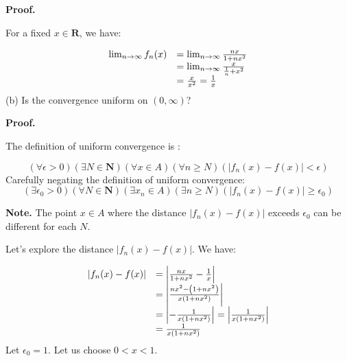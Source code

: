 \documentclass[10pt]{article}
\begin{document}
\textbf{Proof.}



For a fixed $\displaystyle x\in \mathbf{R}$, we have:


\begin{equation*}
\begin{array}{ c l }
\lim _{n\rightarrow \infty } f_{n}( x) & =\lim _{n\rightarrow \infty }\frac{nx}{1+nx^{2}}\\
 & =\lim _{n\rightarrow \infty }\frac{x}{\frac{1}{n} +x^{2}}\\
 & =\frac{x}{x^{2}} =\frac{1}{x}
\end{array}
\end{equation*}
(b) Is the convergence uniform on $\displaystyle ( 0,\infty )$?



\textbf{Proof.}



The definition of uniform convergence is :


\begin{equation*}
( \forall \epsilon  >0)( \exists N\in \mathbf{N})( \forall x\in A)( \forall n\geq N)( |f_{n}( x) -f( x) |< \epsilon )
\end{equation*}
Carefully negating the definition of uniform convergence:
\begin{equation*}
( \exists \epsilon _{0}  >0)( \forall N\in \mathbf{N})( \exists x_{n} \in A)( \exists n\geq N)( |f_{n}( x) -f( x) |\geq \epsilon _{0})
\end{equation*}


\textbf{Note.} The point $\displaystyle x\in A$ where the distance $\displaystyle |f_{n}( x) -f( x) |$ exceeds $\displaystyle \epsilon _{0}$ can be different for each $\displaystyle N$.



Let's explore the distance $\displaystyle |f_{n}( x) -f( x) |$. We have:


\begin{equation*}
\begin{array}{ c l }
|f_{n}( x) -f( x) | & =\left| \frac{nx}{1+nx^{2}} -\frac{1}{x}\right| \\
 & =\left| \frac{nx^{2} -\left( 1+nx^{2}\right)}{x\left( 1+nx^{2}\right)}\right| \\
 & =\left| -\frac{1}{x\left( 1+nx^{2}\right)}\right| =\left| \frac{1}{x\left( 1+nx^{2}\right)}\right| \\
 & =\frac{1}{x\left( 1+nx^{2}\right)}
\end{array}
\end{equation*}
Let $\displaystyle \epsilon _{0} =1$. Let us choose $\displaystyle 0< x< 1$. 
\end{document}
